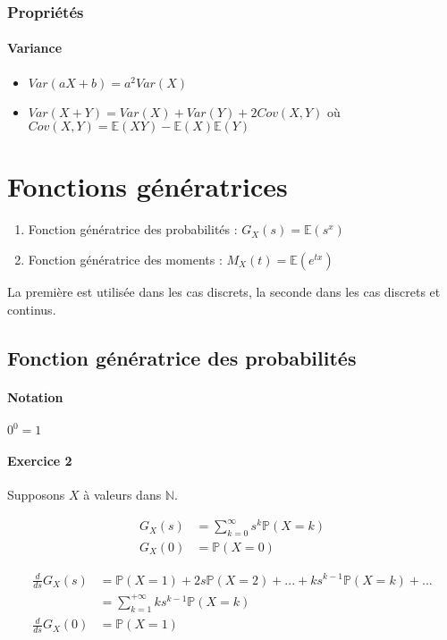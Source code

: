 \documentclass{article}
\begin{document}
\subsubsection{Propriétés}
\paragraph{Variance}
\begin{itemize}
  \item $ \textit{Var}(aX+b) = a^2\textit{Var}(X) $
  \item $ \textit{Var}(X+Y) = \textit{Var}(X) + \textit{Var}(Y) + 2\textit{Cov}(X,Y)$
  où $ \textit{Cov}(X, Y) = \mathbb{E}(XY)-\mathbb{E}(X)\mathbb{E}(Y) $
\end{itemize}

\section{Fonctions génératrices}
\begin{enumerate}
  \item Fonction génératrice des probabilités : $ G_X(s) = \mathbb{E}(s^x) $
  \item Fonction génératrice des moments : $ M_X(t) = \mathbb{E}(e^{tx}) $
\end{enumerate}

La première est utilisée dans les cas discrets, la seconde dans les cas discrets et continus.

\subsection{Fonction génératrice des probabilités}
\paragraph{Notation} $0^0 = 1$

\paragraph{Exercice 2} Supposons $X$ à valeurs dans $\mathbb{N}$.

\begin{align*}
  G_X(s) &= \sum_{k=0}^{\infty} s^k \mathbb{P}(X=k) \\
  G_X(0) &= \mathbb{P}(X=0)
\end{align*}

\begin{align*}
  \frac{d}{ds}G_X(s) &= \mathbb{P}(X=1) + 2s\mathbb{P}(X=2) + ... + ks^{k-1}\mathbb{P}(X=k) + ... \\
  &= \sum_{k=1}^{+ \infty} ks^{k-1}\mathbb{P}(X=k) \\
  \frac{d}{ds}G_X(0) &= \mathbb{P}(X=1)
\end{align*}
\end{document}
